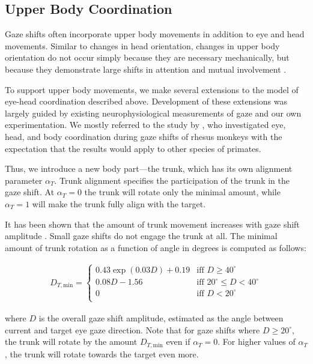\subsection{Upper Body Coordination}

Gaze shifts often incorporate upper body movements in addition to eye and head movements. Similar to changes in head orientation, changes in upper body orientation do not occur simply because they are necessary mechanically, but because they demonstrate large shifts in attention and mutual involvement \cite{kendon1973visible}.

To support upper body movements, we make several extensions to the model of eye-head coordination described above. Development of these extensions was largely guided by existing neurophysiological measurements of gaze and our own experimentation. We mostly referred to the study by \citet{mccluskey2007monkeys}, who investigated eye, head, and body coordination during gaze shifts of rhesus monkeys with the expectation that the results would apply to other species of primates.

Thus, we introduce a new body part---the trunk, which has its own alignment parameter $\alpha_T$. Trunk alignment specifies the participation of the trunk in the gaze shift. At $\alpha_T = 0$ the trunk will rotate only the minimal amount, while $\alpha_T = 1$ will make the trunk fully align with the target.

It has been shown that the amount of trunk movement increases with gaze shift amplitude \cite{mccluskey2007monkeys}. Small gaze shifts do not engage the trunk at all. The minimal amount of trunk rotation as a function of angle in degrees is computed as follows:

\begin{align} \label{eq:TrunkDmin}
D_{T,\mathrm{min}} = \begin{cases}
0.43 \mathop{exp}(0.03 D) + 0.19 & \mbox{iff } D \geq 40^{\circ} \\
0.08 D - 1.56 & \mbox{iff } 20^{\circ} \leq D < 40^{\circ} \\
0 & \mbox{iff } D < 20^{\circ} \\
\end{cases}
\end{align}

where $D$ is the overall gaze shift amplitude, estimated as the angle between current and target eye gaze direction. Note that for gaze shifts where $D \geq 20^{\circ}$, the trunk will rotate by the amount $D_{T,\mathrm{min}}$ even if $\alpha_T = 0$. For higher values of $\alpha_T$, the trunk will rotate towards the target even more.

